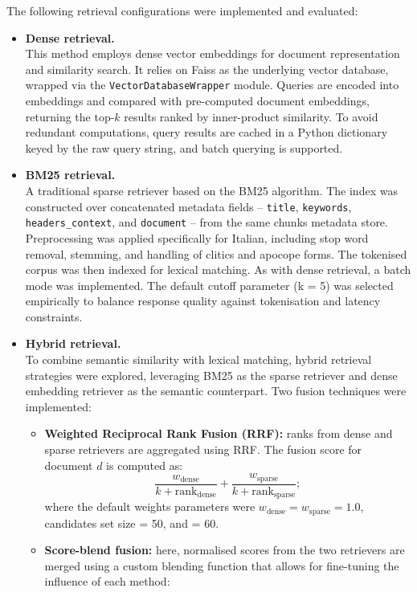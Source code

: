 \begin{spacing}{1.5}
\noindent The following retrieval configurations were implemented and evaluated:
\begin{itemize}
    \item \textbf{Dense retrieval.}\\
    This method employs dense vector embeddings for document representation and similarity search. It relies on Faiss as the underlying vector database, wrapped via the \texttt{VectorDatabaseWrapper} module. Queries are encoded into embeddings and compared with pre-computed document embeddings, returning the top-$k$ results ranked by inner-product similarity. To avoid redundant computations, query results are cached in a Python dictionary keyed by the raw query string, and batch querying is supported.
    \item \textbf{BM25 retrieval.}\\ 
    A traditional sparse retriever based on the BM25 algorithm. The index was constructed over concatenated metadata fields -- \texttt{title}, \texttt{keywords}, \texttt{headers\_context}, and \texttt{document} -- from the same chunks metadata store. Preprocessing was applied specifically for Italian, including stop word removal, stemming, and handling of clitics and apocope forms. The tokenised corpus was then indexed for lexical matching. As with dense retrieval, a batch mode was implemented. The default cutoff parameter (k = 5) was selected empirically to balance response quality against tokenisation and latency constraints.
    \item \textbf{Hybrid retrieval.}\\ 
    To combine semantic similarity with lexical matching, hybrid retrieval strategies were explored, leveraging BM25 as the sparse retriever and dense embedding retriever as the semantic counterpart. Two fusion techniques were implemented:
    \begin{itemize}
            \item \textbf{Weighted Reciprocal Rank Fusion (RRF):} ranks from dense and sparse retrievers are aggregated using RRF. The fusion score for document $d$ is computed as:
\[
\frac{w_\mathrm{dense}}{k + \mathrm{rank}_\mathrm{dense}} + \frac{w_\mathrm{sparse}}{k + \mathrm{rank}_\mathrm{sparse}} ;
\]
where the default weights parameters were $w_{\text{dense}} = w_{\text{sparse}} = 1.0$, candidates set size = 50, and  = 60.
            \item \textbf{Score-blend fusion:} here, normalised scores from the two retrievers are merged using a custom blending function that allows for fine-tuning the influence of each method:

\end{itemize}
\end{itemize}
\end{spacing}
